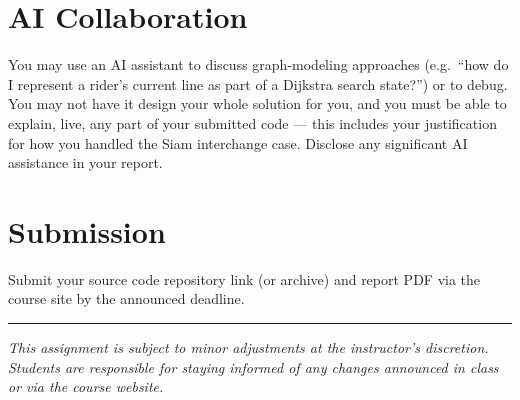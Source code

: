 \documentclass[11pt,a4paper]{article}
\begin{document}
\section{AI Collaboration}
You may use an AI assistant to discuss graph-modeling approaches (e.g.\
``how do I represent a rider's current line as part of a Dijkstra search
state?'') or to debug. You may not have it design your whole solution for
you, and you must be able to explain, live, any part of your submitted
code --- this includes your justification for how you handled the Siam
interchange case. Disclose any significant AI assistance in your report.

\section{Submission}
Submit your source code repository link (or archive) and report PDF via
the course site by the announced deadline.

\bigskip
\noindent\rule{\linewidth}{0.4pt}
\begin{center}
  \small\textit{This assignment is subject to minor adjustments at the
  instructor's discretion. Students are responsible for staying informed
  of any changes announced in class or via the course website.}
\end{center}
\end{document}
